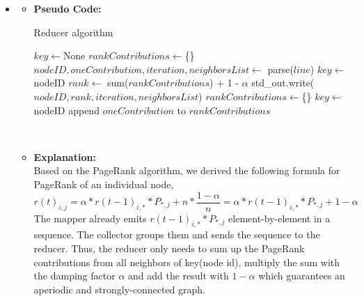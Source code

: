 \begin{itemize}
    \item {}
    \begin{itemize}
    \item \textbf{Pseudo Code:}\\
    \begin{minipage}{\linewidth}
    \begin{algorithm}[H]
    \caption{Reducer algorithm}\label{process}
    \begin{algorithmic}[1]
    \State$key \gets $None
    \State$rankContributions \gets $\{\}
    \State$nodeID, oneContribution, iteration, neighborsList \gets$ parse($line$)
    \State $key \gets $nodeID
        \State$rank \gets$ sum($rankContributions$) + 1 - \(\alpha\) 
        \State std\_out.write($nodeID, rank, iteration, neighborsList$)
        \State $rankContributions \gets $\{\}
        \State $key \gets $nodeID 
    \EndIf
    \State append $oneContribution$ to $rankContributions$
    \EndFor
    \EndProcedure
    \end{algorithmic}
    \end{algorithm}
    \end{minipage} \\[1em]

    \item \textbf{Explanation:}\\
    Based on the PageRank algorithm, we derived the following formula for PageRank of an individual node,
    \[r(t)_{i,j} = \alpha * r(t-1)_{i, *} * P_{*, j} + n * \frac{1-\alpha}{n} =  \alpha * r(t-1)_{i, *} * P_{*, j} + 1 - \alpha\]
    The mapper already emits \(r(t-1)_{i, *} * P_{*, j}\) element-by-element in a sequence. The collector groups them and sends the sequence to the reducer. Thus, the reducer only needs to sum up the PageRank contributions from all neighbors of key(node id),  multiply the sum with the damping factor \(\alpha\) and add the result with \(1 - \alpha\) which guarantees an aperiodic and strongly-connected graph.

    \end{itemize}
    

\end{itemize}
